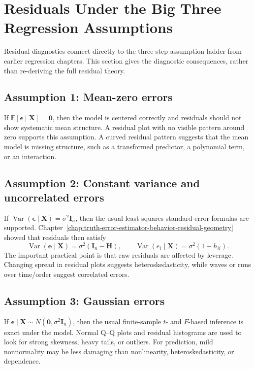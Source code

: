 \section{Residuals Under the Big Three Regression Assumptions}

Residual diagnostics connect directly to the three-step assumption ladder from earlier regression chapters.  This section gives the diagnostic consequences, rather than re-deriving the full residual theory.

\subsection{Assumption 1: Mean-zero errors}

If \(\mathbb{E}[\boldsymbol{\epsilon}\mid \mathbf{X}]=\mathbf{0}\), then the model is centered correctly and residuals should not show systematic mean structure.  A residual plot with no visible pattern around zero supports this assumption.  A curved residual pattern suggests that the mean model is missing structure, such as a transformed predictor, a polynomial term, or an interaction.

\subsection{Assumption 2: Constant variance and uncorrelated errors}

If \(\operatorname{Var}(\boldsymbol{\epsilon}\mid \mathbf{X})=\sigma^2\mathbf{I}_n\), then the usual least-squares standard-error formulas are supported.  Chapter~\ref{chap:truth-error-estimator-behavior-residual-geometry} showed that residuals then satisfy
\begin{equation}
  \operatorname{Var}(\mathbf{e}\mid \mathbf{X})=\sigma^2(\mathbf{I}_n-\mathbf{H}),
  \qquad
  \operatorname{Var}(e_i\mid \mathbf{X})=\sigma^2(1-h_{ii}).
\end{equation}
The important practical point is that raw residuals are affected by leverage.  Changing spread in residual plots suggests heteroskedasticity, while waves or runs over time/order suggest correlated errors.

\subsection{Assumption 3: Gaussian errors}

If \(\boldsymbol{\epsilon}\mid \mathbf{X}\sim N(\mathbf{0},\sigma^2\mathbf{I}_n)\), then the usual finite-sample \(t\)- and \(F\)-based inference is exact under the model.  Normal Q--Q plots and residual histograms are used to look for strong skewness, heavy tails, or outliers.  For prediction, mild nonnormality may be less damaging than nonlinearity, heteroskedasticity, or dependence.

